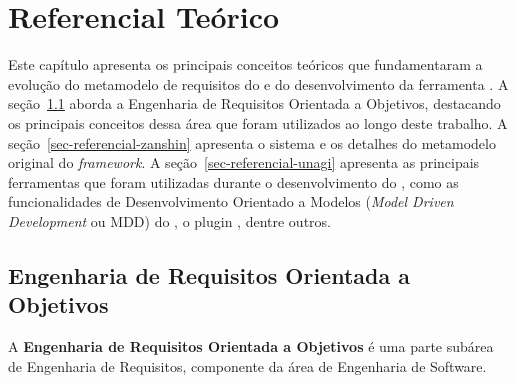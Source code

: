 % 
\chapter{Referencial Teórico}
\label{sec-referencial}

Este capítulo apresenta os principais conceitos teóricos que fundamentaram a evolução do metamodelo de requisitos do \zanshin e do desenvolvimento da ferramenta \unagi. A seção~\ref{sec-referencial-engenharia-requisitos} aborda a Engenharia de Requisitos Orientada a Objetivos, destacando os principais conceitos dessa área que foram utilizados ao longo deste trabalho. A seção~\ref{sec-referencial-zanshin} apresenta o sistema \zanshin e os detalhes do metamodelo original do \textit{framework}. A seção~\ref{sec-referencial-unagi} apresenta as principais ferramentas que foram utilizadas durante o desenvolvimento do \unagi, como as funcionalidades de Desenvolvimento Orientado a Modelos (\textit{Model Driven Development} ou MDD) do \eclipse, o plugin \sirius, dentre outros.


\section{Engenharia de Requisitos Orientada a Objetivos}
\label{sec-referencial-engenharia-requisitos}

A \textbf{Engenharia de Requisitos Orientada a Objetivos} é uma parte subárea de Engenharia de Requisitos, componente da área de Engenharia de Software. 

